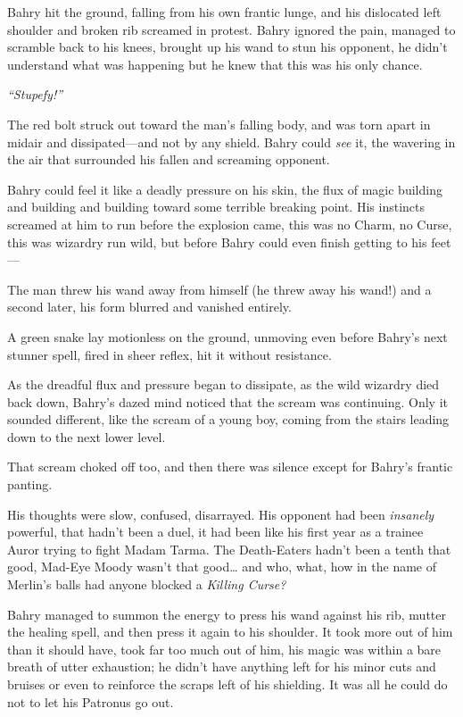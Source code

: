 Bahry hit the ground, falling from his own frantic lunge, and his
dislocated left shoulder and broken rib screamed in protest. Bahry
ignored the pain, managed to scramble back to his knees, brought up his
wand to stun his opponent, he didn't understand what was happening but
he knew that this was his only chance.

\emph{``Stupefy!''}

The red bolt struck out toward the man's falling body, and was torn
apart in midair and dissipated---and not by any shield. Bahry could
\emph{see} it, the wavering in the air that surrounded his fallen and
screaming opponent.

Bahry could feel it like a deadly pressure on his skin, the flux of
magic building and building and building toward some terrible breaking
point. His instincts screamed at him to run before the explosion came,
this was no Charm, no Curse, this was wizardry run wild, but before
Bahry could even finish getting to his feet---

The man threw his wand away from himself (he threw away his wand!) and a
second later, his form blurred and vanished entirely.

A green snake lay motionless on the ground, unmoving even before Bahry's
next stunner spell, fired in sheer reflex, hit it without resistance.

As the dreadful flux and pressure began to dissipate, as the wild
wizardry died back down, Bahry's dazed mind noticed that the scream was
continuing. Only it sounded different, like the scream of a young boy,
coming from the stairs leading down to the next lower level.

That scream choked off too, and then there was silence except for
Bahry's frantic panting.

His thoughts were slow, confused, disarrayed. His opponent had been
\emph{insanely} powerful, that hadn't been a duel, it had been like his
first year as a trainee Auror trying to fight Madam Tarma. The
Death-Eaters hadn't been a tenth that good, Mad-Eye Moody wasn't that
good\ldots{} and who, what, how in the name of Merlin's balls had anyone
blocked a \emph{Killing Curse?}

Bahry managed to summon the energy to press his wand against his rib,
mutter the healing spell, and then press it again to his shoulder. It
took more out of him than it should have, took far too much out of him,
his magic was within a bare breath of utter exhaustion; he didn't have
anything left for his minor cuts and bruises or even to reinforce the
scraps left of his shielding. It was all he could do not to let his
Patronus go out.

